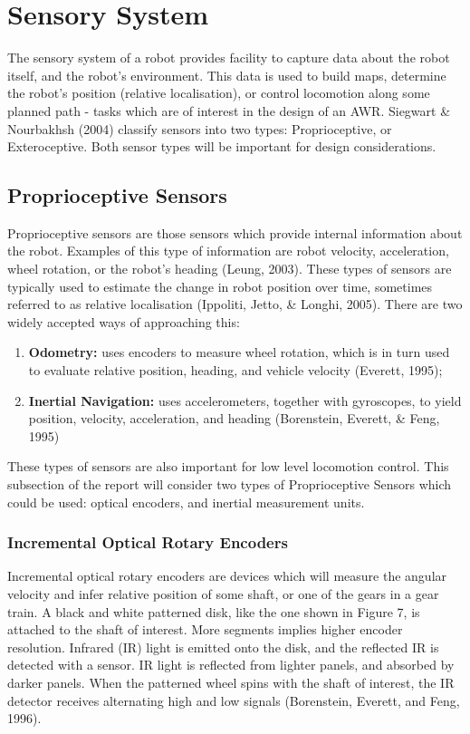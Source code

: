 \documentclass[a4paper]{article}
\begin{document}
\clearpage

\section{Sensory System}
The sensory system of a robot provides facility to capture data about the robot itself, and the robot's environment. This data is used to build maps, determine the robot's position (relative localisation), or control locomotion along some planned path - tasks which are of interest in the design of an AWR. Siegwart \& Nourbakhsh (2004) classify sensors into two types: Proprioceptive, or Exteroceptive. Both sensor types will be important for design considerations.
\subsection{Proprioceptive Sensors}
Proprioceptive sensors are those sensors which provide internal information about the robot. Examples of this type of information are robot velocity, acceleration, wheel rotation, or the robot's heading (Leung, 2003). These types of sensors are typically used to estimate the change in robot position over time, sometimes referred to as relative localisation (Ippoliti, Jetto, \& Longhi, 2005). There are two widely accepted ways of approaching this:
\begin{enumerate}
\item \textbf{Odometry:} uses encoders to measure wheel rotation, which is in turn used to evaluate relative position, heading, and vehicle velocity (Everett, 1995);
\item \textbf{Inertial Navigation:} uses accelerometers, together with gyroscopes, to yield position, velocity, acceleration, and heading (Borenstein, Everett, \& Feng, 1995)
\end{enumerate}

These types of sensors are also important for low level locomotion control. This subsection of the report will consider two types of Proprioceptive Sensors which could be used: optical encoders, and inertial measurement units.

\subsubsection{Incremental Optical Rotary Encoders}
Incremental optical rotary encoders are devices which will measure the angular velocity and infer relative position of some shaft, or one of the gears in a gear train. A black and white patterned disk, like the one shown in Figure 7, is attached to the shaft of interest. More segments implies higher encoder resolution. Infrared (IR) light is emitted onto the disk, and the reflected IR is detected with a sensor. IR light is reflected from lighter panels, and absorbed by darker panels. When the patterned wheel spins with the shaft of interest, the IR detector receives alternating high and low signals (Borenstein, Everett, and Feng, 1996).\\
\end{document}
